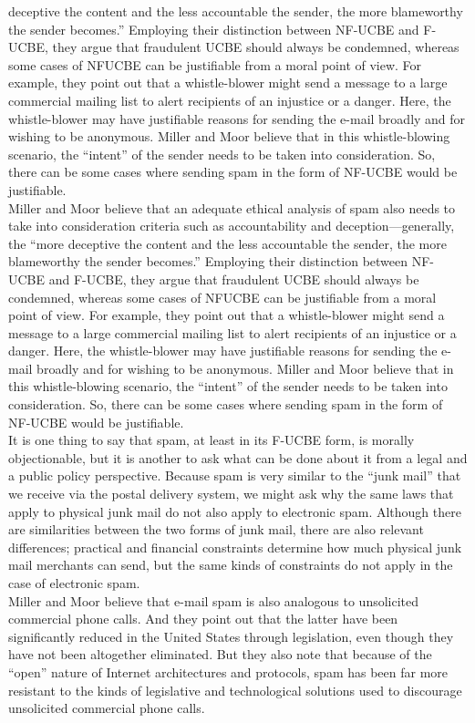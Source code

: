 \documentclass[12pt]{article}
\theoremstyle{definition}
\begin{document}
deceptive the content and the less accountable the sender, the more blameworthy the
sender becomes.” Employing their distinction between NF-UCBE and F-UCBE, they
argue that fraudulent UCBE should always be condemned, whereas some cases of NFUCBE
can be justifiable from a moral point of view. For example, they point out that a
whistle-blower might send a message to a large commercial mailing list to alert recipients
of an injustice or a danger. Here, the whistle-blower may have justifiable reasons for
sending the e-mail broadly and for wishing to be anonymous. Miller and Moor believe
that in this whistle-blowing scenario, the “intent” of the sender needs to be taken into
consideration. So, there can be some cases where sending spam in the form of NF-UCBE
would be justifiable.\\
Miller and Moor believe that an adequate ethical analysis of spam also needs to take
into consideration criteria such as accountability and deception—generally, the “more
deceptive the content and the less accountable the sender, the more blameworthy the
sender becomes.” Employing their distinction between NF-UCBE and F-UCBE, they
argue that fraudulent UCBE should always be condemned, whereas some cases of NFUCBE
can be justifiable from a moral point of view. For example, they point out that a
whistle-blower might send a message to a large commercial mailing list to alert recipients
of an injustice or a danger. Here, the whistle-blower may have justifiable reasons for
sending the e-mail broadly and for wishing to be anonymous. Miller and Moor believe
that in this whistle-blowing scenario, the “intent” of the sender needs to be taken into
consideration. So, there can be some cases where sending spam in the form of NF-UCBE
would be justifiable.\\
It is one thing to say that spam, at least in its F-UCBE form, is morally objectionable,
but it is another to ask what can be done about it from a legal and a public policy
perspective. Because spam is very similar to the “junk mail” that we receive via the postal
delivery system, we might ask why the same laws that apply to physical junk mail do not
also apply to electronic spam. Although there are similarities between the two forms of
junk mail, there are also relevant differences; practical and financial constraints determine
how much physical junk mail merchants can send, but the same kinds of constraints
do not apply in the case of electronic spam.\\
Miller and Moor believe that e-mail spam is also analogous to unsolicited commercial
phone calls. And they point out that the latter have been significantly reduced in the
United States through legislation, even though they have not been altogether eliminated.
But they also note that because of the “open” nature of Internet architectures and
protocols, spam has been far more resistant to the kinds of legislative and technological
solutions used to discourage unsolicited commercial phone calls.\\
\end{document}
